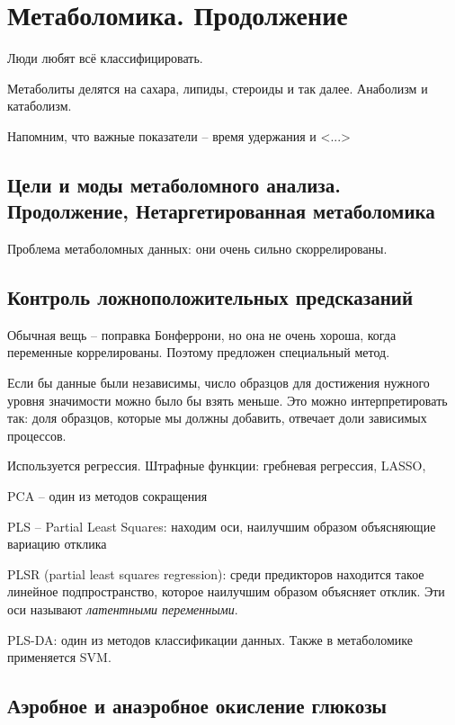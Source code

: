 \documentclass[main.tex]{subfiles}
\begin{document}
\section{Метаболомика. Продолжение}

Люди любят всё классифицировать.

Метаболиты делятся на сахара, липиды, стероиды и так далее.
Анаболизм и катаболизм.

Напомним, что важные показатели -- время удержания и <...>

\subsection{Цели и моды метаболомного анализа. Продолжение, Нетаргетированная метаболомика}

Проблема метаболомных данных: они очень сильно скоррелированы.

\subsection{Контроль ложноположительных предсказаний}

Обычная вещь -- поправка Бонферрони, но она не очень хороша, когда переменные коррелированы.
Поэтому предложен специальный метод.


Если бы данные были независимы, число образцов для достижения нужного уровня значимости можно было бы взять меньше.
Это можно интерпретировать так: доля образцов, которые мы должны добавить, отвечает доли зависимых процессов.

Используется регрессия.
Штрафные функции: гребневая регрессия, LASSO,

PCA --  один из методов сокращения 

PLS -- Partial Least Squares: находим оси, наилучшим образом объясняющие вариацию отклика

PLSR (partial least squares regression): среди предикторов находится такое линейное подпространство, которое наилучшим образом объясняет отклик.
Эти оси называют \emph{латентными переменными}.

PLS-DA: один из методов классификации данных.
Также в метаболомике применяется SVM.

\subsection{ Аэробное и анаэробное окисление глюкозы }
\end{document}
